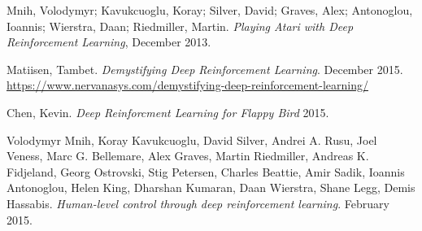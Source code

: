 \documentclass{article}
\begin{document}
\begin{thebibliography}{9}

Mnih, Volodymyr; Kavukcuoglu, Koray; Silver, David; Graves, Alex; Antonoglou, Ioannis; Wierstra, Daan; Riedmiller, Martin.
\emph{Playing Atari with Deep Reinforcement Learning},
December 2013.

Matiisen, Tambet.
\emph{Demystifying Deep Reinforcement Learning}. December 2015.
\url{https://www.nervanasys.com/demystifying-deep-reinforcement-learning/}

Chen, Kevin.
\emph{Deep Reinforcment Learning for Flappy Bird}
2015.

Volodymyr Mnih,	Koray Kavukcuoglu,	David Silver, Andrei A. Rusu, Joel Veness, Marc G. Bellemare, Alex Graves,	Martin Riedmiller, Andreas K. Fidjeland, Georg Ostrovski, Stig Petersen, Charles Beattie, Amir Sadik, Ioannis Antonoglou,	Helen King,	Dharshan Kumaran, Daan Wierstra, Shane Legg, Demis Hassabis.
\emph{Human-level control through deep reinforcement learning}.
February 2015.

\end{thebibliography}
\end{document}
